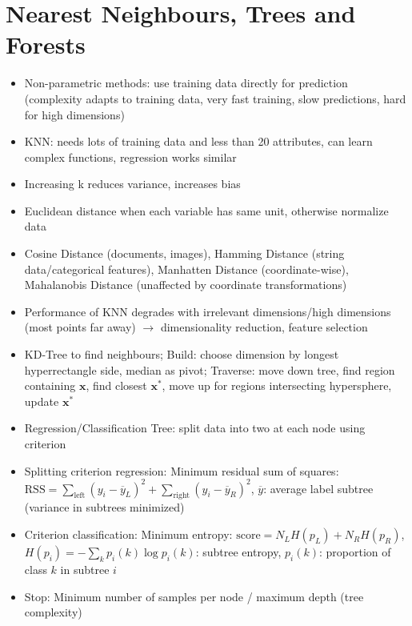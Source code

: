 \documentclass[11pt]{scrartcl}
\begin{document}
\section{Nearest Neighbours, Trees and Forests}

\begin{itemize}
    \item Non-parametric methods: use training data directly for prediction (complexity adapts 
        to training data, very fast training, slow predictions, hard for high dimensions)
    \item KNN: needs lots of training data and less than 20 attributes, can learn complex 
        functions, regression works similar
    \item Increasing k reduces variance, increases bias
    \item Euclidean distance when each variable has same unit, otherwise normalize data
    \item Cosine Distance (documents, images), Hamming Distance (string data/categorical 
        features), Manhatten Distance (coordinate-wise), Mahalanobis Distance (unaffected by 
        coordinate transformations)
    \item Performance of KNN degrades with irrelevant dimensions/high dimensions (most points 
        far away) \(\rightarrow\) dimensionality reduction, feature selection
    \item KD-Tree to find neighbours; Build: choose dimension by longest hyperrectangle side, 
        median as pivot; Traverse: move down tree, find region containing \( \bm{x} \), find 
        closest \( \bm{x}^* \), move up for regions intersecting hypersphere, update \( \bm{x}^* \)
    \item Regression/Classification Tree: split data into two at each node using criterion
    \item Splitting criterion regression: Minimum residual sum of squares: \( \mathrm{RSS} = 
        \sum_\mathrm{left} ( y_i - \overline{y}_L )^2 + \sum_\mathrm{right} ( y_i - 
        \overline{y}_R )^2 \), \( \overline{y} \): average label subtree (variance in subtrees 
        minimized)
    \item Criterion classification: Minimum entropy: \( \mathrm{score} = 
        N_L H ( p_L ) + N_R H ( p_R ) \), \( H ( p_i ) = - \sum_k p_i ( k ) \log p_i ( k ) \): 
        subtree entropy, \( p_i ( k ) \): proportion of class \( k \) in subtree \( i \)
    \item Stop: Minimum number of samples per node / maximum depth (tree complexity)

\end{itemize}
\end{document}
